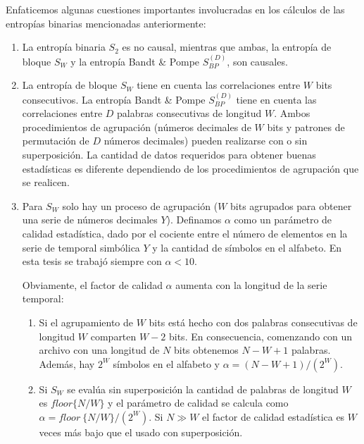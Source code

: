 Enfaticemos algunas cuestiones importantes involucradas en los cálculos de las entropías binarias mencionadas anteriormente:
\begin{enumerate}
	\item La entropía binaria $S_2$ es no causal, mientras que ambas, la entropía de bloque $S_W$ y la entropía Bandt \& Pompe $S^{(D)}_{BP}$, son causales.
	\item La entropía de bloque $S_W$ tiene en cuenta las correlaciones entre $W$ bits consecutivos.
	La entropía Bandt \& Pompe $S^{(D)}_{BP}$ tiene en cuenta las correlaciones entre $D$ palabras consecutivas de longitud $W$.
	Ambos procedimientos de agrupación (números decimales de $W$ bits y patrones de permutación de $D$ números decimales) pueden realizarse con o sin superposición.
	La cantidad de datos requeridos para obtener buenas estadísticas es diferente dependiendo de los procedimientos de agrupación que se realicen.
	\item Para $ S_W $ solo hay un proceso de agrupación ($W$ bits agrupados para obtener una serie de números decimales $Y$).
	Definamos $\alpha$ como un parámetro de calidad estadística, dado por el cociente entre el número de elementos en la serie de temporal simbólica $Y$ y la cantidad de símbolos en el alfabeto.
	En esta tesis se trabajó siempre con $\alpha < 10$.
	
	Obviamente, el factor de calidad $\alpha$ aumenta con la longitud de la serie temporal:
	\begin{enumerate}
		\item Si el agrupamiento de $W$ bits está hecho con dos palabras consecutivas de longitud $W$ comparten $W-2$ bits.
		En consecuencia, comenzando con un archivo con una longitud de $N$ bits obtenemos $N - W + 1$ palabras.
		Además, hay $2 ^ W$ símbolos en el alfabeto y $\alpha = (N - W + 1) / (2 ^ W)$.
		\item Si $S_W$ se evalúa sin superposición la cantidad de palabras de longitud $W$ es $floor\{N/W\}$ y el parámetro de calidad se calcula como $\alpha=floor~\{N/W\}/(2^W)$.
		Si $N \gg W$ el factor de calidad estadística es $W$ veces más bajo que el usado con superposición.
	\end{enumerate}
	

\end{enumerate}
